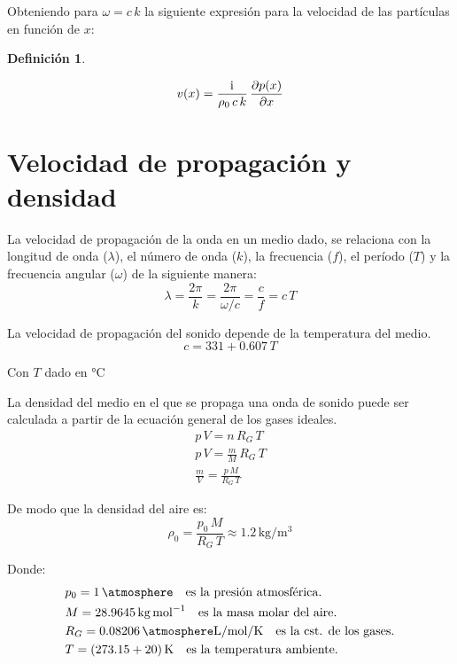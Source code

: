 \documentclass[a5paper,12pt,twoside]{book}
\newtheorem{defn}{{Definición}}[chapter]
\begin{document}
Obteniendo para $\omega=c\,k$ la siguiente expresión para la velocidad de las partículas en función de $x$:

\begin{mdframed}[style=MyFrame1]
    \begin{defn}
        \label{defn:particlesVelocity}
    \end{defn}
    \begin{equation*}
        v(x) = \frac{\mathrm{i}\mkern1mu}{\rho_0 \, c \, k} \, \frac{\partial p(x)}{\partial x}
    \end{equation*}
\end{mdframed}

\section{Velocidad de propagación y densidad}

La velocidad de propagación de la onda en un medio dado, se relaciona con la longitud de onda ($\lambda$), el número de onda ($k$), la frecuencia ($f$), el período ($T$) y la frecuencia angular ($\omega$) de la siguiente manera:
\begin{equation*}
    \lambda = \frac{2 \pi}{k} = \frac{2 \pi}{\omega/c} = \frac{c}{f} = c \, T
\end{equation*}

La velocidad de propagación del sonido depende de la temperatura del medio.
\begin{equation*} %
    c = 331 + 0.607 \, T
\end{equation*}

Con $T$ dado en $\si{\celsius}$

La densidad del medio en el que se propaga una onda de sonido puede ser calculada a partir de la ecuación general de los gases ideales.
\begin{gather*}
    p \, V = n \, R_G \, T
    \\
    p \, V = \frac{m}{M} \, R_G \, T
    \\
    \frac{m}{V} = \frac{p \, M}{R_G \, T}
\end{gather*}

De modo que la densidad del aire es:
\begin{equation*}
    \rho_0 = \frac{p_0 \, M}{R_G \, T} \approx 1.2\,\si{\kilo\gram\per\metre^3}
\end{equation*}

Donde:
\begin{align*}
    & p_0 = 1\,\si{\atmosphere} \quad\text{es la presión atmosférica.}
    \\
    & M = 28.9645\,\si{\kilo\gram\per\mol} \quad\text{es la masa molar del aire.}
    \\
    & R_G = 0.08206\,\si{\atmosphere\litre\per\mol\per\kelvin} \quad\text{es la cst. de los gases.}
    \\
    & T = (273.15+20)\,\si{\kelvin} \quad\text{es la temperatura ambiente.}
\end{align*}
\end{document}
